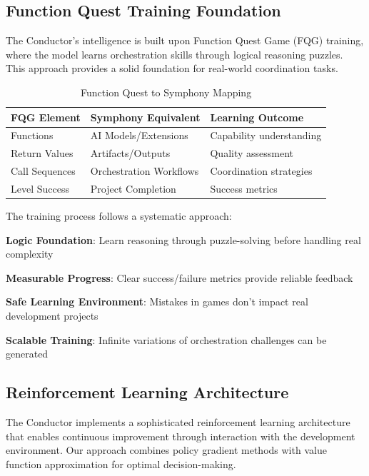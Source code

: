 \subsection*{Function Quest Training Foundation}

The Conductor's intelligence is built upon Function Quest Game (FQG) training, where the model learns orchestration skills through logical reasoning puzzles. This approach provides a solid foundation for real-world coordination tasks.

\begin{table}[ht]
\centering
\begin{tabular}{@{}lll@{}}
\toprule
\textbf{FQG Element} & \textbf{Symphony Equivalent} & \textbf{Learning Outcome} \\
\midrule
Functions & AI Models/Extensions & Capability understanding \\
Return Values & Artifacts/Outputs & Quality assessment \\
Call Sequences & Orchestration Workflows & Coordination strategies \\
Level Success & Project Completion & Success metrics \\
\bottomrule
\end{tabular}
\caption{Function Quest to Symphony Mapping}
\end{table}

The training process follows a systematic approach:

\begin{expandedlist}
    \item \textbf{Logic Foundation}: Learn reasoning through puzzle-solving before handling real complexity
    \item \textbf{Measurable Progress}: Clear success/failure metrics provide reliable feedback
    \item \textbf{Safe Learning Environment}: Mistakes in games don't impact real development projects
    \item \textbf{Scalable Training}: Infinite variations of orchestration challenges can be generated
\end{expandedlist}

\subsection*{Reinforcement Learning Architecture}

The Conductor implements a sophisticated reinforcement learning architecture that enables continuous improvement through interaction with the development environment. Our approach combines policy gradient methods with value function approximation for optimal decision-making.


